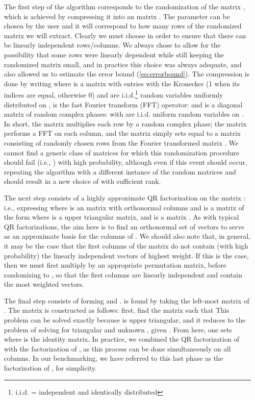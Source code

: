 \documentclass[11pt]{article}
\begin{document}
The first step of the algorithm corresponds to the randomization of the matrix , which is achieved by compressing it into an  matrix .  The parameter  can be chosen by the user and it will correspond to how many rows of the randomized matrix we will extract.  Clearly we must choose  in order to ensure that there can be  linearly independent rows/columns.   We always chose  to allow for the possibility that some rows were linearly dependent while still keeping the randomized matrix small, and in practice this choice was always adequate, and also allowed us to estimate the error bound (\ref{eq:errorbound}).  The compression is done by writing 
where  is a  matrix with entries
with  the Kronecker  (1 when its indices are equal, otherwise 0) and  are i.i.d.\footnote{i.i.d. = independent and identically distributed} random variables uniformly distributed on ,  is the  fast Fourier transform (FFT) operator: and  is a diagonal  matrix of random complex phases: 
with  are i.i.d. uniform random variables on .    In short, the matrix  multiplies each row by a random complex phase; the matrix  performs a FFT on each column, and the matrix  simply sets  equal to a matrix consisting of  randomly chosen rows from the Fourier transformed matrix .   We cannot find a generic class of matrices for which this randomization procedure should fail (i.e., ) with high probability, although even if this event should occur, repeating the algorithm with a different instance of the random matrices  and  should result in a new choice of  with sufficient rank.

The next step consists of a highly approximate QR factorization on the matrix : i.e., expressing where   is an  matrix with orthonormal columns and  is a  matrix of the form  where  is a  upper triangular matrix, and  is a  matrix \cite{cheng}.   As with typical QR factorizations, the aim here is to find an orthonormal set of vectors to serve as an approximate basis for the columns of .    We should also note that, in general, it may be the case that the first  columns of the matrix do not contain (with high probability) the  linearly independent vectors of highest weight.  If this is the case, then we must first multiply   by an appropriate permutation matrix, before randomizing  to , so that the first  columns are linearly independent and contain the  most weighted vectors.

The final step consists of forming  and .   is found by taking the left-most  matrix of .  The matrix  is constructed as follows: first, find the matrix  such that This problem can be solved exactly because  is upper triangular, and it reduces to the problem of solving  for triangular  and unknown , given  \cite{golub}.   From here, one sets 
where  is the  identity matrix.  In practice, we combined the QR factorization of  with the factorization of , as this process can be done simultaneously on all columns.   In our benchmarking, we have referred to this last phase as the factorization of , for simplicity.
\end{document}
